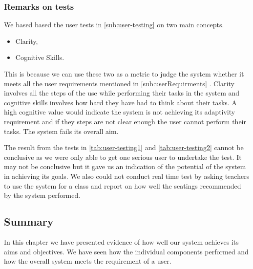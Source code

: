 \subsubsection{Remarks on tests}
We based based the user tests in  \ref{sub:user-testing} on two main concepts.
\begin{itemize}
    \item Clarity,
    \item Cognitive Skills.
\end{itemize}
This is because we can use these two as a metric to judge the system whether it meets all the user requirements mentioned in \ref{sub:userRequirments} . Clarity involves all the steps of the use while performing their tasks in the system and cognitive skills involves how hard they have had to think about their tasks. A high cognitive value would indicate the system is not achieving its adaptivity requirement and if they steps are not clear enough the user cannot perform their tasks. The system fails its overall aim.

The result from the tests in \ref{tab:user-testing1} and \ref{tab:user-testing2} cannot be conclusive as we were only able to get one serious user to undertake the test. It may not be conclusive but it gave us an indication of the potential of the system in achieving its goals. We also could not conduct real time test by asking teachers to use the system for a class and report on how well the seatings recommended by the system performed.
\subsection{Summary}
In this chapter we have presented evidence of how well our system achieves its aims and objectives. We have seen how the individual components performed and how the overall system meets the requirement of a user.